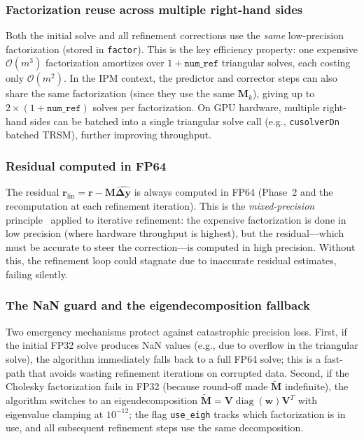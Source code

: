 \documentclass[11pt,twoside]{article}
\newcommand{\by}{\mathbf{y}}
\newcommand{\bM}{\mathbf{M}}
\newcommand{\bV}{\mathbf{V}}
\newcommand{\br}{\mathbf{r}}
\newcommand{\bw}{\mathbf{w}}
\newcommand{\bDelta}{\mathbf{\Delta}}
\newcommand{\cO}{\mathcal{O}}
\newcommand{\diag}{\operatorname{diag}}
\begin{document}
\subsubsection{Factorization reuse across multiple right-hand sides}

Both the initial solve and all refinement corrections use the
\emph{same} low-precision factorization (stored in \texttt{factor}).
This is the key efficiency property: one expensive $\cO(m^3)$
factorization amortizes over $1 + \texttt{num\_ref}$ triangular solves,
each costing only $\cO(m^2)$.  In the IPM context, the predictor and
corrector steps can also share the same factorization (since they use the
same $\bM_k$), giving up to $2 \times (1 + \texttt{num\_ref})$ solves per
factorization.  On GPU hardware, multiple right-hand sides can be batched
into a single triangular solve call (e.g., \texttt{cusolverDn} batched
TRSM), further improving throughput.

\subsubsection{Residual computed in FP64}

The residual $\br_{\text{lin}} = \br - \bM\widehat{\bDelta\by}$ is always
computed in FP64 (Phase~2 and the recomputation at each refinement
iteration).  This is the \emph{mixed-precision} principle~\cite{Carson2018}
applied to iterative refinement: the expensive factorization is done in low
precision (where hardware throughput is highest), but the residual—which
must be accurate to steer the correction—is computed in high precision.
Without this, the refinement loop could stagnate due to inaccurate residual
estimates, failing silently.

\subsubsection{The NaN guard and the eigendecomposition fallback}

Two emergency mechanisms protect against catastrophic precision loss.
First, if the initial FP32 solve produces NaN values (e.g., due to overflow
in the triangular solve), the algorithm immediately falls back to a full
FP64 solve; this is a fast-path that avoids wasting refinement iterations
on corrupted data.  Second, if the Cholesky factorization fails in FP32
(because round-off made $\widetilde{\bM}$ indefinite), the algorithm
switches to an eigendecomposition $\widetilde{\bM} = \bV\diag(\bw)\bV^T$
with eigenvalue clamping at $10^{-12}$; the flag \texttt{use\_eigh} tracks
which factorization is in use, and all subsequent refinement steps use the
same decomposition.
\end{document}
